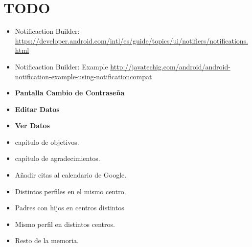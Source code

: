 %
%
%
%

\cleardoublepage
\chapter{TODO}
\label{chap:TODO}

\begin{itemize}
	\item Notificaction Builder: \url{https://developer.android.com/intl/es/guide/topics/ui/notifiers/notifications.html}
	\item Notificaction Builder: Example \url{http://javatechig.com/android/android-notification-example-using-notificationcompat}
	\item {\bf Pantalla Cambio de Contraseña}
	\item {\bf Editar Datos}
	\item {\bf Ver Datos}
	\item capítulo de objetivos.
	\item capítulo de agradecimientos.
	\item Añadir citas al calendario de Google.
	\item Distintos perfiles en el mismo centro.
	\item Padres con hijos en centros distintos
	\item Mismo perfil en distintos centros.
	\item Resto de la memoria.
\end{itemize}